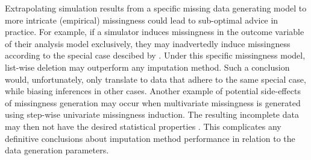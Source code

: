 \documentclass[bimj,fleqn]{w-art}
\begin{document}


Extrapolating simulation results from a specific missing data generating model to more intricate (empirical) missingness could lead to sub-optimal advice in practice. For example, if a simulator induces missingness in the outcome variable of their analysis model exclusively, they may inadvertedly induce missingness according to the special case descibed by \citet[][p. \S 2.7]{buur18}. Under this specific missingness model, list-wise deletion may outperform any imputation method. Such a conclusion would, unfortunately, only translate to data that adhere to the same special case, while biasing inferences in other cases. %
Another example of potential side-effects of missingness generation may occur when multivariate missingness is generated using step-wise univariate missingness induction. The resulting incomplete data may then not have the desired statistical properties \citep[e.g. skewness;][]{ampute}. This complicates any definitive conclusions about imputation method performance in relation to the data generation parameters.
\end{document}
